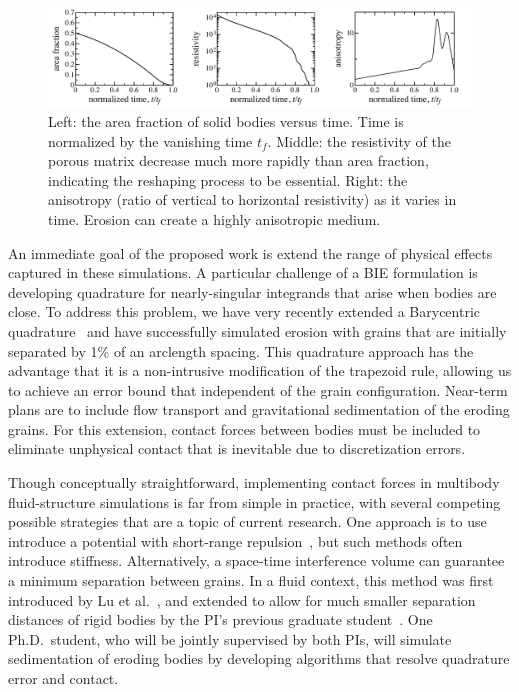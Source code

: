 \documentclass[11pt]{article}
\begin{document}
\begin{figure}%
\begin{center}
\includegraphics[width = 0.99 \textwidth]{./figs/fig3.pdf}
\caption{\label{fig3} Left: the area fraction of solid bodies versus time. Time is normalized by the vanishing time $t_f$. Middle: the resistivity of the porous matrix decrease much more rapidly than area fraction, indicating the reshaping process to be essential. Right: the anisotropy (ratio of vertical to horizontal resistivity) as it varies in time. Erosion can create a highly anisotropic medium.
}
\end{center}
\end{figure}


An immediate goal of the proposed work is extend the range of physical effects captured in these simulations. A particular challenge of a BIE formulation is developing quadrature for nearly-singular integrands that arise when bodies are close. To address this problem, we have very recently extended a Barycentric quadrature~\cite{bar2014, bar-wu-vee2015} and have successfully simulated erosion with grains that are initially separated by 1\% of an arclength spacing. This quadrature approach has the advantage that it is a non-intrusive modification of the trapezoid rule, allowing us to achieve an error bound that independent of the grain configuration. Near-term plans are to include flow transport and gravitational sedimentation of the eroding grains. For this extension, contact forces between bodies must be included to eliminate unphysical contact that is inevitable due to discretization errors. 

Though conceptually straightforward, implementing contact forces in multibody fluid-structure simulations is far from simple in practice, with several competing possible strategies that are a topic of current research.  One approach is to use introduce a potential with short-range repulsion~\cite{}, but such methods often introduce stiffness. Alternatively, a space-time interference volume can guarantee a minimum separation between grains.  In a fluid context, this method was first introduced by Lu et al.~\cite{lu-rah-zor2017}, and extended to allow for much smaller separation distances of rigid bodies by the PI's previous graduate student~\cite{bys-sha-qua2019}. One Ph.D.~student, who will be jointly supervised by both PIs, will simulate sedimentation of eroding bodies by developing algorithms that resolve quadrature error and contact.
\end{document}
